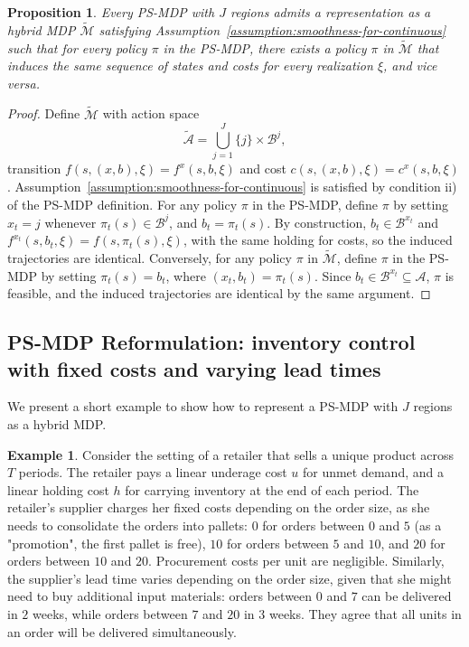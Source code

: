 \documentclass{article}
\newtheorem{proposition}{Proposition}
\theoremstyle{definition}
\newtheorem{example}{Example}
\theoremstyle{remark}
\begin{document}
\begin{proposition}
\label{prop:ps-mdp-factorization}
Every PS-MDP with $J$ regions admits a representation as a hybrid MDP 
$\tilde{\mathcal{M}}$ satisfying Assumption~\ref{assumption:smoothness-for-continuous} 
such that for every policy $\pi$ in the PS-MDP, there exists a policy $\pi$ 
in $\tilde{\mathcal{M}}$ that induces the same sequence of states and costs for every 
realization $\xi$, and vice versa.
\end{proposition}

\begin{proof}
Define $\tilde{\mathcal{M}}$ with action space
\[
\tilde{\mathcal{A}} = \bigcup_{j=1}^J \{j\} \times \mathcal{B}^j,
\]
transition $f(s,(x,b),\xi) = f^{x}(s,b,\xi)$ and cost 
$c(s,(x,b),\xi) = c^{x}(s,b,\xi)$. 
Assumption~\ref{assumption:smoothness-for-continuous} is satisfied by condition ii) 
of the PS-MDP definition.
For any policy $\pi$ in the PS-MDP, define $\pi$ by setting 
$x_t = j$ whenever $\pi_t(s) \in \mathcal{B}^j$, and $b_t = \pi_t(s)$. 
By construction, $b_t \in \mathcal{B}^{x_t}$ and 
$f^{x_t}(s,b_t,\xi) = f(s,\pi_t(s),\xi)$, with the same holding for costs, so the 
induced trajectories are identical.
Conversely, for any policy $\pi$ in $\tilde{\mathcal{M}}$, define $\pi$ in 
the PS-MDP by setting $\pi_t(s) = b_t$, where $(x_t,b_t) = \pi_t(s)$. 
Since $b_t \in \mathcal{B}^{x_t} \subseteq \mathcal{A}$, $\pi$ is feasible, and the 
induced trajectories are identical by the same argument.
\end{proof}

\subsection{PS-MDP Reformulation: inventory control with fixed costs and varying lead times}
\label{appendix:reformulation-inv-control}
We present a short example to show how to represent a PS-MDP with $J$ regions as a hybrid MDP. 
\begin{example}
\label{example:inv-control}    
Consider the setting of a retailer that sells a unique product across $T$ periods. The retailer pays a linear underage cost $u$ for unmet demand, and a linear holding cost $h$ for carrying inventory at the end of each period. The retailer's supplier charges her fixed costs depending on the order size, as she needs to consolidate the orders into pallets: $0$ for orders between $0$ and $5$ (as a "promotion", the first pallet is free), $10$ for orders between $5$ and $10$, and $20$ for orders between $10$ and $20$. Procurement costs per unit are negligible. Similarly, the supplier's lead time varies depending on the order size, given that she might need to buy additional input materials: orders between $0$ and $7$ can be delivered in $2$ weeks, while orders between $7$ and $20$ in $3$ weeks. They agree that all units in an order will be delivered simultaneously.
\end{example}
\end{document}
